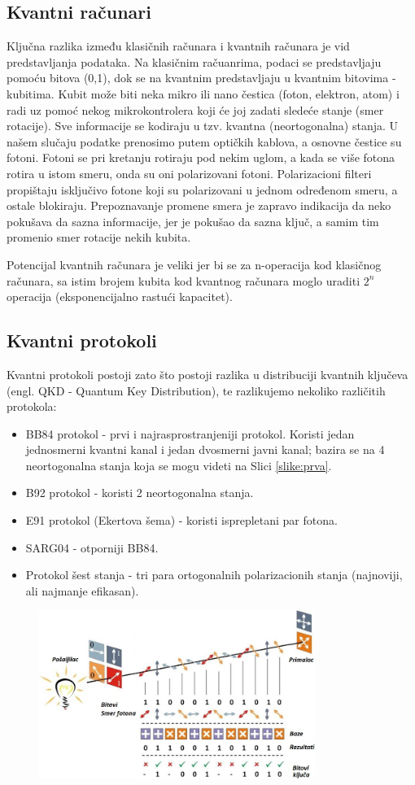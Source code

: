 \documentclass[a4paper]{article}
\begin{document}
{\subsection{Kvantni računari}
Ključna razlika između klasičnih računara i kvantnih računara je vid predstavljanja podataka. Na klasičnim račuanrima, podaci se predstavljaju pomoću bitova (0,1), dok se na kvantnim predstavljaju u kvantnim bitovima - kubitima. Kubit može biti neka mikro ili nano čestica (foton, elektron, atom) i radi uz pomoć nekog mikrokontrolera koji će joj zadati sledeće stanje (smer rotacije). Sve informacije se kodiraju u tzv. kvantna (neortogonalna) stanja. U našem slučaju podatke prenosimo putem optičkih kablova, a osnovne čestice su fotoni. Fotoni se pri kretanju rotiraju pod nekim uglom, a kada se više fotona rotira u istom smeru, onda su oni polarizovani fotoni. Polarizacioni filteri propištaju isključivo fotone koji su polarizovani u jednom određenom smeru, a ostale blokiraju. Prepoznavanje promene smera je zapravo indikacija da neko pokušava da sazna informacije, jer je pokušao da sazna ključ, a samim tim promenio smer rotacije nekih kubita.


Potencijal kvantnih računara je veliki jer bi se za n-operacija kod klasičnog računara, sa istim brojem kubita kod kvantnog računara moglo uraditi $ 2^{n} $ operacija (eksponencijalno rastući kapacitet). 
\subsection{Kvantni protokoli}
\label{qkd}
Kvantni protokoli\cite{stjepankvantna} postoji zato što postoji razlika u distribuciji kvantnih ključeva (engl. QKD - Quantum Key Distribution), te razlikujemo nekoliko različitih protokola:
\begin{itemize}
\item BB84 protokol - prvi i najrasprostranjeniji protokol. Koristi jedan jednosmerni kvantni kanal i jedan dvosmerni javni kanal; bazira se na 4 neortogonalna stanja koja se mogu videti na Slici \ref{slike:prva}. 
\item B92 protokol - koristi 2 neortogonalna stanja.
\item E91 protokol (Ekertova šema) - koristi isprepletani par fotona.
\item SARG04 - otporniji BB84.
\item Protokol šest stanja  - tri para ortogonalnih polarizacionih stanja (najnoviji, ali najmanje efikasan).
\end{itemize}
\begin{figure}[h]
\centering
\includegraphics[width=0.8\textwidth]{bb84.jpg}


\end{figure}}
\end{document}
